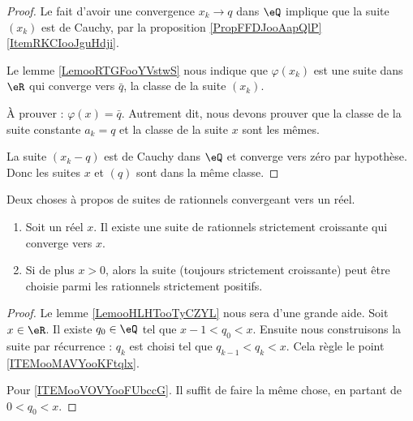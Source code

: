 \begin{proof}
    Le fait d'avoir une convergence \( x_k\to q\) dans \( \eQ\) implique que la suite \( (x_k)\) est de Cauchy, par la proposition \ref{PropFFDJooAapQlP}\ref{ItemRKCIooJguHdji}.
    
    Le lemme \ref{LemooRTGFooYVstwS} nous indique que \( \varphi(x_k)\) est une suite dans \( \eR\) qui converge vers \( \bar q\), la classe de la suite \( (x_k)\).

    À prouver : \( \varphi(x)=\bar q\). Autrement dit, nous devons prouver que la classe de la suite constante \( a_k=q\) et la classe de la suite \( x\) sont les mêmes.

    La suite \( (x_k-q)\) est de Cauchy dans \( \eQ\) et converge vers zéro par hypothèse. Donc les suites \(x\) et \( (q)\) sont dans la même classe.
\end{proof}

\begin{proposition}     \label{PROPooFGBOooHiZqbs}
    Deux choses à propos de suites de rationnels convergeant vers un réel.
    \begin{enumerate}
        \item       \label{ITEMooMAVYooKFtqlx}
    Soit un réel \( x\). Il existe une suite de rationnels strictement croissante qui converge vers \( x\).
\item       \label{ITEMooVOVYooFUbccG}
    Si de plus \( x>0\), alors la suite (toujours strictement croissante) peut être choisie parmi les rationnels strictement positifs.
    \end{enumerate}
\end{proposition}

\begin{proof}
    Le lemme \ref{LemooHLHTooTyCZYL} nous sera d'une grande aide. Soit \( x\in \eR\). Il existe \( q_0\in \eQ\) tel que \( x-1<q_0<x\). Ensuite nous construisons la suite par récurrence : \( q_k\) est choisi tel que \( q_{k-1}<q_k<x\). Cela règle le point \ref{ITEMooMAVYooKFtqlx}.

    Pour \ref{ITEMooVOVYooFUbccG}. Il suffit de faire la même chose, en partant de \( 0<q_0<x\).
\end{proof}

